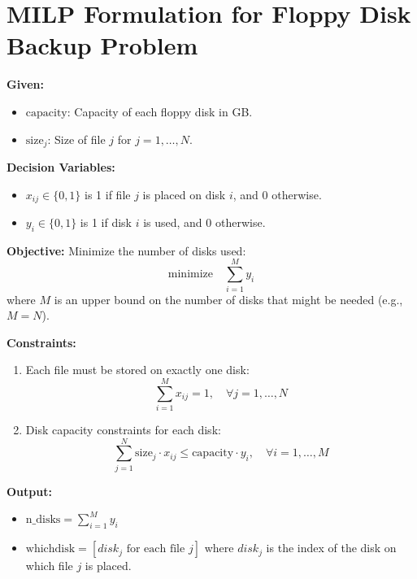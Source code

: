 \documentclass{article}
\begin{document}
\section*{MILP Formulation for Floppy Disk Backup Problem}

\textbf{Given:}
\begin{itemize}
    \item \(\text{capacity}\): Capacity of each floppy disk in GB.
    \item \(\text{size}_j\): Size of file \(j\) for \(j = 1, \ldots, N\).
\end{itemize}

\textbf{Decision Variables:}
\begin{itemize}
    \item \(x_{ij} \in \{0, 1\}\) is 1 if file \(j\) is placed on disk \(i\), and 0 otherwise.
    \item \(y_i \in \{0, 1\}\) is 1 if disk \(i\) is used, and 0 otherwise.
\end{itemize}

\textbf{Objective:}
Minimize the number of disks used:
\[
\text{minimize} \quad \sum_{i=1}^{M} y_i
\]
where \(M\) is an upper bound on the number of disks that might be needed (e.g., \(M = N\)).

\textbf{Constraints:}
\begin{enumerate}
    \item Each file must be stored on exactly one disk:
    \[
    \sum_{i=1}^{M} x_{ij} = 1, \quad \forall j = 1, \ldots, N
    \]
    \item Disk capacity constraints for each disk:
    \[
    \sum_{j=1}^{N} \text{size}_j \cdot x_{ij} \leq \text{capacity} \cdot y_i, \quad \forall i = 1, \ldots, M
    \]
\end{enumerate}

\textbf{Output:}
\begin{itemize}
    \item \(\text{n\_disks} = \sum_{i=1}^{M} y_i\)
    \item \(\text{whichdisk} = [disk_j \text{ for each file } j]\) where \(disk_j\) is the index of the disk on which file \(j\) is placed.
\end{itemize}
\end{document}
